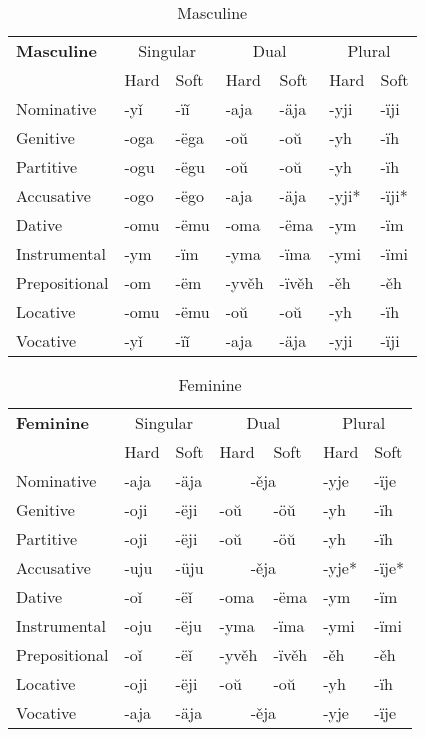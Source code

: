 \begin{table}
	\caption{Masculine}
	\begin{tabular}{lllllll}
		\textbf{Masculine}       
		& \multicolumn{2}{c}{Singular} 
		& \multicolumn{2}{c}{Dual} 
		& \multicolumn{2}{c}{Plural} \\
		& Hard   & Soft  & Hard   & Soft   & Hard  & Soft \\
		Nominative    & -yǐ & -ïǐ     
		& -aja  & -äja        
		& -yji & -ïji \\
		Genitive      & -oga & -ëga 
		& -oŭ & -oŭ
		& -yh & -ïh \\
		Partitive     & -ogu & -ëgu 
		& -oŭ & -oŭ
		& -yh & -ïh \\
		Accusative    & -ogo & -ëgo     
		& -aja & -äja
		& -yji* & -ïji*  \\
		Dative		  & -omu & -ëmu
		& -oma & -ëma 
		& -ym & -ïm \\  
		Instrumental  & -ym & -ïm     
		& -yma & -ïma   
		& -ymi & -ïmi \\
		Prepositional & -om & -ëm  
		& -yvěh & -ïvěh     
		& -ěh & -ěh \\
		Locative      & -omu & -ëmu      
		& -oŭ & -oŭ
		& -yh & -ïh \\
		Vocative       & -yǐ & -ïǐ     
		& -aja  & -äja        
		& -yji & -ïji 
	\end{tabular}
\end{table}


\begin{table}
	\caption{Feminine}
	\begin{tabular}{lllllll}
		\textbf{Feminine}       
		& \multicolumn{2}{c}{Singular} 
		& \multicolumn{2}{c}{Dual} 
		& \multicolumn{2}{c}{Plural} \\
		& Hard   & Soft  & Hard   & Soft   & Hard  & Soft \\
		Nominative    & -aja & -äja     
		& \multicolumn{2}{c}{-ěja}        
		& -yje & -ïje \\
		Genitive      & -oji & -ëji
		& -oŭ & -öŭ
		& -yh & -ïh \\
		Partitive    & -oji & -ëji
		& -oŭ & -öŭ
		& -yh & -ïh \\
		Accusative    & -uju & -üju     
		& \multicolumn{2}{c}{-ěja} 
		& -yje* & -ïje*  \\
		Dative		  & -oǐ & -ëǐ
		& -oma & -ëma 
		& -ym & -ïm \\  
		Instrumental  & -oju & -ëju
		& -yma & -ïma   
		& -ymi & -ïmi \\
		Prepositional  & -oǐ & -ëǐ
		& -yvěh & -ïvěh     
		& -ěh & -ěh \\
		Locative      & -oji & -ëji      
		& -oŭ & -oŭ
		& -yh & -ïh \\
		Vocative      & -aja & -äja     
		& \multicolumn{2}{c}{-ěja}        
		& -yje & -ïje 
	\end{tabular}
\end{table}

